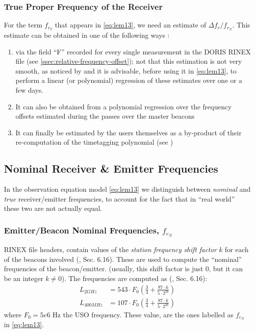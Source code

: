 \subsubsection{True Proper Frequency of the Receiver}
\label{sssec:true-proprtfrequency-of-the-receiver}

For the term \(f_{r_T}\) that appears in \ref{eq:lem13}, we need an estimate of \(\Delta f_{r} / f_{r_N}\). 
This estimate can be obtained in one of the following ways \cite{lemoine-2016}:
\begin{enumerate}
    \item via the field ``F'' recorded for every single measurement in the DORIS 
    RINEX file (see \ref{ssec:relative-frequency-offset}); not that this estimation 
    is not very smooth, as noticed by \cite{GAO2015} and it is advisable, before 
    using it in \ref{eq:lem13}, to perform a linear (or polynomial) regression of 
    these estimates over one or a few days.

    \item It can also be obtained from a polynomial regression
    over the frequency oﬀsets estimated during the passes
    over the master beacons

    \item It can ﬁnally be estimated by the users themselves as a
    by-product of their re-computation of the timetagging polynomial (see \cite{MERCIER2010})
\end{enumerate}

\subsection{Nominal Receiver \& Emitter Frequencies}
\label{ssec:nominal-frequencies}
In the observation equation model \ref{eq:lem13} we distinguish between 
\emph{nominal} and \emph{true} receiver/emitter frequencies, to account for 
the fact that in ``real world'' these two are not actually equal.

\subsubsection{Emitter/Beacon Nominal Frequencies, $f_{e_N}$}
\label{sssec:beacon-nominal-frequencies}

RINEX file headers, contain values of the \emph{station frequency shift 
factor} $k$ for each of the beacons involved (\cite{DORISRNX3}, Sec. 6.16). 
These are used to compute the ``nominal'' frequencies of the beacon/emitter. 
(usually, this shift factor is just $0$, but it can be an integer 
$k \neq 0$). The frequencies are computed as (\cite{DORISRNX3}, Sec. 6.16):
\begin{equation}
  \begin{aligned}
    L_{2GHz}   &= 543 \cdot F_0 \left( \frac{3}{4} + \frac{87\cdot k}{5 \cdot 2^{26}} \right) \\
    L_{400MHz} &= 107 \cdot F_0 \left( \frac{3}{4} + \frac{87\cdot k}{5 \cdot 2^{26}} \right) 
    \label{eq:nominal-freq}
  \end{aligned}
\end{equation}
where $F_0 = 5e6 \text{ Hz}$ the USO frequency. These value, are the ones 
labelled as $f_{e_N}$ in \ref{eq:lem13}.

